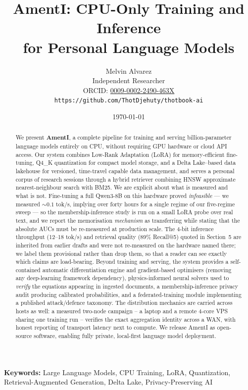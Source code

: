 \documentclass[11pt,a4paper]{article}
\title{AmentI: CPU-Only Training and Inference\\
       for Personal Language Models}
\author{
    Melvin Alvarez\\
    \small Independent Researcher\\
    \small ORCID: \href{https://orcid.org/0009-0002-2490-463X}{0009-0002-2490-463X}\\
    \small \texttt{https://github.com/ThotDjehuty/thotbook-ai}
}
\date{\today}
\theoremstyle{plain}
\theoremstyle{definition}
\begin{document}
\maketitle

\begin{abstract}
We present \textbf{AmentI}, a complete pipeline for training and
serving billion-parameter language models entirely on CPU, without requiring
GPU hardware or cloud API access. Our system combines Low-Rank Adaptation
(LoRA) for memory-efficient fine-tuning, Q4\_K quantization for compact model
storage, and a Delta Lake--based data lakehouse for versioned, time-travel
capable data management, and serves a personal corpus of research sessions
through a hybrid retriever combining HNSW approximate nearest-neighbour
search with BM25. We are explicit about what is measured and what is not.
Fine-tuning a full Qwen3-8B on this hardware proved \emph{infeasible} --- we
measured ${\sim}0.1$ tok/s, implying over forty hours for a single regime of
our five-regime sweep --- so the membership-inference study is run on a small
LoRA probe over real text, and we report the memorisation \emph{mechanism} as
transferring while stating that the absolute AUCs must be re-measured at
production scale. The 4-bit inference throughput (12--18 tok/s) and retrieval
quality (89\% Recall@5) quoted in Section~5 are inherited from earlier drafts
and were not re-measured on the hardware named there; we label them
provisional rather than drop them, so that a reader can see exactly which
claims are load-bearing. Beyond training and serving, the system provides a self-contained automatic
differentiation engine and gradient-based optimisers (removing any
deep-learning framework dependency), physics-informed neural solvers used to
\emph{verify} the equations appearing in ingested documents, a
membership-inference privacy audit producing calibrated probabilities, and a
federated-training module implementing a published attack/defence taxonomy.
The distribution mechanics are carried across hosts as well: a measured
two-node campaign -- a laptop and a remote 4-core VPS sharing one training
run -- verifies the exact aggregation identity across a WAN, with honest
reporting of transport latency next to compute.
We release AmentI as open-source software, enabling fully private,
local-first language model deployment.
\end{abstract}

\textbf{Keywords:} Large Language Models, CPU Training, LoRA, Quantization,
Retrieval-Augmented Generation, Delta Lake, Privacy-Preserving AI
\end{document}
